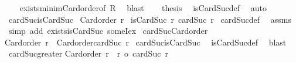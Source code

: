 \begin{isabellebody}
\ \ \isamarkupfalse%
\ exists{\isacharunderscore}{\kern0pt}minim{\isacharunderscore}{\kern0pt}Card{\isacharunderscore}{\kern0pt}order{\isacharbrackleft}{\kern0pt}of\ {\isacharquery}{\kern0pt}R{\isacharbrackright}{\kern0pt}\ \isamarkupfalse%
\ blast\isanewline
\ \ \isamarkupfalse%
\ {\isacharquery}{\kern0pt}thesis\ \isamarkupfalse%
\ isCardSuc{\isacharunderscore}{\kern0pt}def\ \isamarkupfalse%
\ auto\isanewline
{}\isamarkupfalse%
%
\endisatagproof
{\isafoldproof}%
%
\isadelimproof
\isanewline
%
\endisadelimproof
\isanewline
{}\isamarkupfalse%
\ cardSuc{\isacharunderscore}{\kern0pt}isCardSuc{\isacharcolon}{\kern0pt}\isanewline
{}\ {\isachardoublequoteopen}Card{\isacharunderscore}{\kern0pt}order\ r{\isachardoublequoteclose}\isanewline
{}\ {\isachardoublequoteopen}isCardSuc\ r\ {\isacharparenleft}{\kern0pt}cardSuc\ r{\isacharparenright}{\kern0pt}{\isachardoublequoteclose}\isanewline
%
\isadelimproof
%
\endisadelimproof
%
\isatagproof
{}\isamarkupfalse%
\ cardSuc{\isacharunderscore}{\kern0pt}def\ \isamarkupfalse%
\ assms\isanewline
{}\isamarkupfalse%
\ {\isacharparenleft}{\kern0pt}simp\ add{\isacharcolon}{\kern0pt}\ exists{\isacharunderscore}{\kern0pt}isCardSuc\ someI{\isacharunderscore}{\kern0pt}ex{\isacharparenright}{\kern0pt}%
\endisatagproof
{\isafoldproof}%
%
\isadelimproof
\isanewline
%
\endisadelimproof
\isanewline
{}\isamarkupfalse%
\ cardSuc{\isacharunderscore}{\kern0pt}Card{\isacharunderscore}{\kern0pt}order{\isacharcolon}{\kern0pt}\isanewline
{\isachardoublequoteopen}Card{\isacharunderscore}{\kern0pt}order\ r\ {\isasymLongrightarrow}\ Card{\isacharunderscore}{\kern0pt}order{\isacharparenleft}{\kern0pt}cardSuc\ r{\isacharparenright}{\kern0pt}{\isachardoublequoteclose}\isanewline
%
\isadelimproof
%
\endisadelimproof
%
\isatagproof
{}\isamarkupfalse%
\ cardSuc{\isacharunderscore}{\kern0pt}isCardSuc\ \isamarkupfalse%
\ isCardSuc{\isacharunderscore}{\kern0pt}def\ \isamarkupfalse%
\ blast%
\endisatagproof
{\isafoldproof}%
%
\isadelimproof
\isanewline
%
\endisadelimproof
\isanewline
{}\isamarkupfalse%
\ cardSuc{\isacharunderscore}{\kern0pt}greater{\isacharcolon}{\kern0pt}\isanewline
{\isachardoublequoteopen}Card{\isacharunderscore}{\kern0pt}order\ r\ {\isasymLongrightarrow}\ r\ {\isacharless}{\kern0pt}o\ cardSuc\ r{\isachardoublequoteclose}\isanewline
%
\isadelimproof
%
\endisadelimproof

\end{isabellebody}
